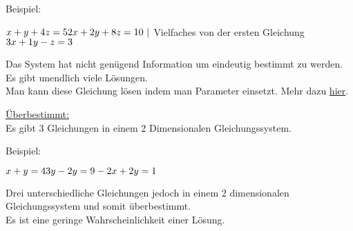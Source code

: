Beispiel:

$
x + y + 4z = 5 \\
2x + 2y + 8z = 10\ |\ $Vielfaches von der ersten Gleichung$ \\
3x + 1y - z = 3
$

Das System hat nicht genügend Information um eindeutig bestimmt zu werden. \\
Es gibt unendlich viele Lösungen. \\
Man kann diese Gleichung lösen indem man Parameter einsetzt. 
Mehr dazu \hyperref[sec:lineare_parameter]{hier}.

\bigskip

\underline{Überbestimmt:} \\
Es gibt 3 Gleichungen in einem 2 Dimensionalen Gleichungssystem.

Beispiel: 

$
x + y = 4 \\
3y - 2y = 9 \\
-2x + 2y = 1
$

Drei unterschiedliche Gleichungen jedoch in einem 2 dimensionalen Gleichungssystem und somit überbestimmt. \\
Es ist eine geringe Wahrscheinlichkeit einer Lösung.

